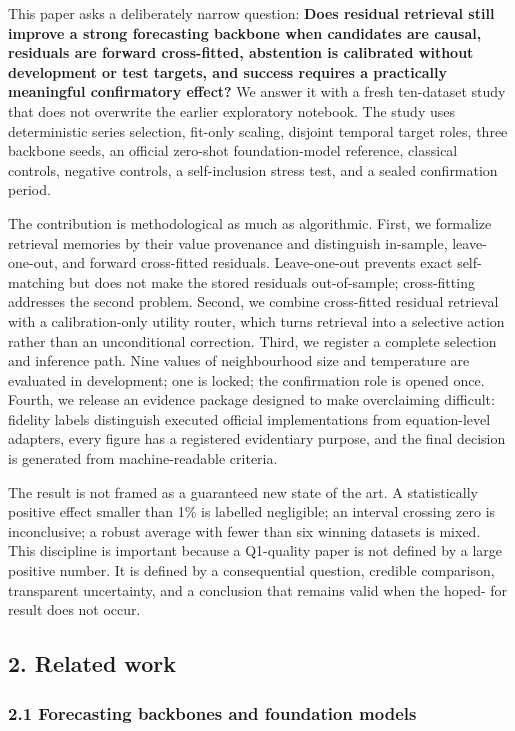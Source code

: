 \documentclass[
]{article}
\begin{document}
This paper asks a deliberately narrow question: \textbf{Does residual
retrieval still improve a strong forecasting backbone when candidates
are causal, residuals are forward cross-fitted, abstention is calibrated
without development or test targets, and success requires a practically
meaningful confirmatory effect?} We answer it with a fresh ten-dataset
study that does not overwrite the earlier exploratory notebook. The
study uses deterministic series selection, fit-only scaling, disjoint
temporal target roles, three backbone seeds, an official zero-shot
foundation-model reference, classical controls, negative controls, a
self-inclusion stress test, and a sealed confirmation period.

The contribution is methodological as much as algorithmic. First, we
formalize retrieval memories by their value provenance and distinguish
in-sample, leave-one-out, and forward cross-fitted residuals.
Leave-one-out prevents exact self-matching but does not make the stored
residuals out-of-sample; cross-fitting addresses the second problem.
Second, we combine cross-fitted residual retrieval with a
calibration-only utility router, which turns retrieval into a selective
action rather than an unconditional correction. Third, we register a
complete selection and inference path. Nine values of neighbourhood size
and temperature are evaluated in development; one is locked; the
confirmation role is opened once. Fourth, we release an evidence package
designed to make overclaiming difficult: fidelity labels distinguish
executed official implementations from equation-level adapters, every
figure has a registered evidentiary purpose, and the final decision is
generated from machine-readable criteria.

The result is not framed as a guaranteed new state of the art. A
statistically positive effect smaller than 1\% is labelled negligible;
an interval crossing zero is inconclusive; a robust average with fewer
than six winning datasets is mixed. This discipline is important because
a Q1-quality paper is not defined by a large positive number. It is
defined by a consequential question, credible comparison, transparent
uncertainty, and a conclusion that remains valid when the hoped- for
result does not occur.

\subsection{2. Related work}\label{2-related-work}

\subsubsection{2.1 Forecasting backbones and foundation
models}\label{21-forecasting-backbones-and-foundation-models}
\end{document}

